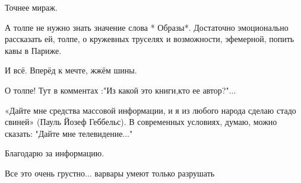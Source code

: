 \begin{itemize}
\begin{itemize}
Точнее мираж.

 

А толпе не нужно знать значение слова * Образы*.
Достаточно эмоционально рассказать ей, толпе, о кружевных труселях и возможности,
эфемерной, попить кавы в Париже.

И всё. Вперёд к мечте, жжём шины.
\end{itemize}

 
О толпе! Тут в комментах :"Из какой это книги,кто ее автор?"...🤣

 
«Дайте мне средства массовой информации, и я из любого народа сделаю стадо
свиней» (Пауль Йозеф Геббельс). В современных условиях, думаю, можно сказать:
"Дайте мне телевидение..."

 
Благодарю за информацию.

 
Все это очень грустно... варвары умеют только разрушать

 


\end{itemize}
